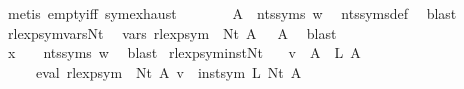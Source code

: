 \begin{isabellebody}
\ {\isacharparenleft}{\kern0pt}metis\ empty{\isacharunderscore}{\kern0pt}iff\ sym{\isachardot}{\kern0pt}exhaust{\isacharparenright}{\kern0pt}\isanewline
\ \ \isamarkupfalse%
\ {\isacharasterisk}{\kern0pt}{\isacharasterisk}{\kern0pt}\ \isamarkupfalse%
\ {\isacharasterisk}{\kern0pt}{\isacharasterisk}{\kern0pt}{\isacharasterisk}{\kern0pt}{\isacharasterisk}{\kern0pt}{\isacharcolon}{\kern0pt}\ {\isachardoublequoteopen}A\ {\isasymin}\ nts{\isacharunderscore}{\kern0pt}syms\ w{\isachardoublequoteclose}\ \isamarkupfalse%
\ nts{\isacharunderscore}{\kern0pt}syms{\isacharunderscore}{\kern0pt}def\ \isamarkupfalse%
\ blast\isanewline
\ \ \isamarkupfalse%
\ rlexp{\isacharunderscore}{\kern0pt}sym{\isacharunderscore}{\kern0pt}vars{\isacharunderscore}{\kern0pt}Nt\ \isamarkupfalse%
\ {\isachardoublequoteopen}vars\ {\isacharparenleft}{\kern0pt}rlexp{\isacharunderscore}{\kern0pt}sym\ {\isasymgamma}{\isacharprime}{\kern0pt}\ {\isacharparenleft}{\kern0pt}Nt\ A{\isacharparenright}{\kern0pt}{\isacharparenright}{\kern0pt}\ {\isacharequal}{\kern0pt}\ {\isacharbraceleft}{\kern0pt}{\isasymgamma}{\isacharprime}{\kern0pt}\ A{\isacharbraceright}{\kern0pt}{\isachardoublequoteclose}\ \isamarkupfalse%
\ blast\isanewline
\ \ \isamarkupfalse%
\ {\isacharasterisk}{\kern0pt}\ {\isacharasterisk}{\kern0pt}{\isacharasterisk}{\kern0pt}\ {\isacharasterisk}{\kern0pt}{\isacharasterisk}{\kern0pt}{\isacharasterisk}{\kern0pt}\ {\isacharasterisk}{\kern0pt}{\isacharasterisk}{\kern0pt}{\isacharasterisk}{\kern0pt}{\isacharasterisk}{\kern0pt}\ \isamarkupfalse%
\ {\isachardoublequoteopen}x\ {\isasymin}\ {\isasymgamma}{\isacharprime}{\kern0pt}\ {\isacharbackquote}{\kern0pt}\ nts{\isacharunderscore}{\kern0pt}syms\ w{\isachardoublequoteclose}\ \isamarkupfalse%
\ blast\isanewline
{}\isamarkupfalse%
%
\endisatagproof
{\isafoldproof}%
%
\isadelimproof
\isanewline
%
\endisadelimproof
\isanewline
\isanewline
{}\isamarkupfalse%
\ rlexp{\isacharunderscore}{\kern0pt}sym{\isacharunderscore}{\kern0pt}inst{\isacharunderscore}{\kern0pt}Nt{\isacharcolon}{\kern0pt}\isanewline
\ \ \ {\isachardoublequoteopen}v\ {\isacharparenleft}{\kern0pt}{\isasymgamma}{\isacharprime}{\kern0pt}\ A{\isacharparenright}{\kern0pt}\ {\isacharequal}{\kern0pt}\ L\ A{\isachardoublequoteclose}\isanewline
\ \ \ \ \ {\isachardoublequoteopen}eval\ {\isacharparenleft}{\kern0pt}rlexp{\isacharunderscore}{\kern0pt}sym\ {\isasymgamma}{\isacharprime}{\kern0pt}\ {\isacharparenleft}{\kern0pt}Nt\ A{\isacharparenright}{\kern0pt}{\isacharparenright}{\kern0pt}\ v\ {\isacharequal}{\kern0pt}\ inst{\isacharunderscore}{\kern0pt}sym\ L\ {\isacharparenleft}{\kern0pt}Nt\ A{\isacharparenright}{\kern0pt}{\isachardoublequoteclose}\isanewline

\end{isabellebody}
